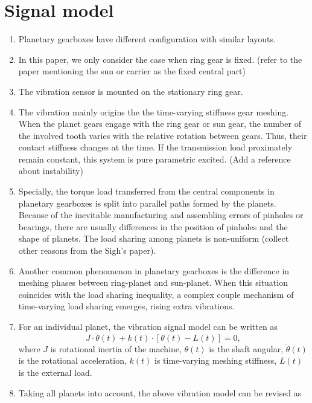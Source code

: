 \documentclass[a4paper,fleqn]{cas-sc}
\begin{document}
\section{Signal model}
\begin{enumerate}[1.]
    \item Planetary gearboxes have different configuration with similar layouts.
    \item In this paper, we only consider the case when ring gear is fixed. (refer to the paper mentioning the sun or carrier as the fixed central part)
    \item The vibration sensor is mounted on the stationary ring gear.
    \item The vibration mainly origins the the time-varying stiffness gear meshing. When the planet gears engage with the ring gear or sun gear, the number of the involved tooth varies with the relative rotation between gears. Thus, their contact stiffness changes at the time. If the transmission load proximately remain constant, this system is pure parametric excited. (Add a reference about instability) 
    \item Specially, the torque load transferred from the central components in planetary gearboxes is split into parallel paths formed by the planets. Because of the inevitable manufacturing and assembling errors of pinholes or bearings, there are usually differences in the position of pinholes and the shape of planets. The load sharing among planets is non-uniform (collect other reasons from the Sigh's paper).
    \item Another common phenomenon in planetary gearboxes is the difference in meshing phases between ring-planet and sun-planet. When this situation coincides with the load sharing inequality, a complex couple mechanism of time-varying load sharing emerges, rising extra vibrations.
    \item For an individual planet, the vibration signal model can be written as
    \begin{equation}
        J \cdot \ddot{\theta}(t) + k(t) \cdot \left[\theta(t)-L(t) \right] = 0,
    \end{equation}
    where \(J\) is rotational inertia of the machine, \(\theta(t)\) is the shaft angular, \(\ddot{\theta}(t)\) is the rotational acceleration, \(k(t)\) is time-varying meshing stiffness, \(L(t)\) is the external load.
    \item Taking all planets into account, the above vibration model can be revised as
    \begin{equation}

\end{equation}
\end{enumerate}
\end{document}
